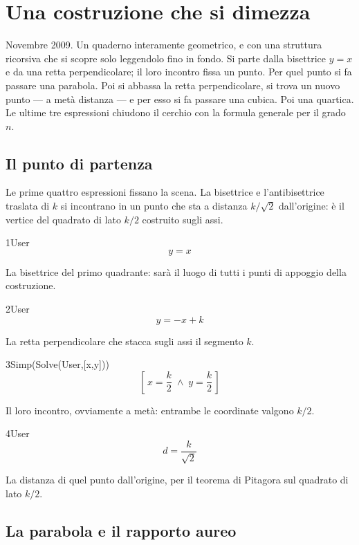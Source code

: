 \chapter{Una costruzione che si dimezza}
\label{cap:teoria2}

Novembre 2009. Un quaderno interamente geometrico, e con una struttura ricorsiva che si scopre solo leggendolo fino in fondo. Si parte dalla bisettrice $y=x$ e da una retta perpendicolare; il loro incontro fissa un punto. Per quel punto si fa passare una parabola. Poi si abbassa la retta perpendicolare, si trova un nuovo punto — a metà distanza — e per esso si fa passare una cubica. Poi una quartica. Le ultime tre espressioni chiudono il cerchio con la formula generale per il grado $n$.

\section{Il punto di partenza}

Le prime quattro espressioni fissano la scena. La bisettrice e l'antibisettrice traslata di $k$ si incontrano in un punto che sta a distanza $k/\sqrt{2}$ dall'origine: è il vertice del quadrato di lato $k/2$ costruito sugli assi.

\begin{espr}{1}{User}{}
\[
y = x
\]
\end{espr}
La bisettrice del primo quadrante: sarà il luogo di tutti i punti di appoggio della costruzione.

\begin{espr}{2}{User}{}
\[
y = -x + k
\]
\end{espr}
La retta perpendicolare che stacca sugli assi il segmento $k$.

\begin{espr}{3}{Simp(Solve(User,[x,y]))}{}
\[
\left[\, x = \frac{k}{2} \;\land\; y = \frac{k}{2} \,\right]
\]
\end{espr}
Il loro incontro, ovviamente a metà: entrambe le coordinate valgono $k/2$.

\begin{espr}{4}{User}{}
\[
d = \frac{k}{\sqrt{2}}
\]
\end{espr}
La distanza di quel punto dall'origine, per il teorema di Pitagora sul quadrato di lato $k/2$.

\section{La parabola e il rapporto aureo}

